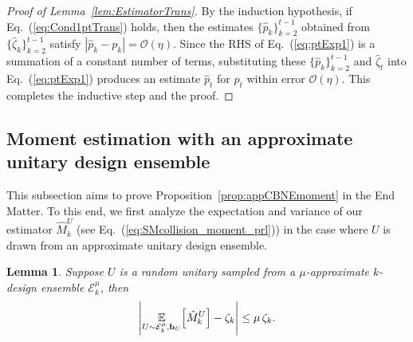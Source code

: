 \documentclass[aps,prl,twocolumn,nofootinbib,superscriptaddress,10pt]{revtex4-2}
\let\originalleft\left
\let\originalright\right
\renewcommand{\left}{\mathopen{}\mathclose\bgroup\originalleft}
\renewcommand{\right}{\aftergroup\egroup\originalright}
\def\E{ {\mathbb E} } %
\theoremstyle{plain}
\newtheorem{lemma}{Lemma}
\theoremstyle{definition}
\newcommand{\eref}[1]{Eq.~\textup{(\ref{#1})}}
\newcommand{\lref}[1]{Lemma~\ref{#1}}
\newcommand{\pref}[1]{Proposition~\ref{#1}}
\begin{document}
\begin{proof}[Proof of \lref{lem:EstimatorTrans}]
By the induction hypothesis, if \eref{eq:Cond1ptTrans} holds, then the estimates $\{\hat{p}_k\}_{k=2}^{t-1}$ obtained from $\{\hat{\zeta}_k\}_{k=2}^{t-1}$ satisfy $|\hat{p}_k - p_k| = \mathcal{O}(\eta)$. %
Since the RHS of \eref{eq:ptExp1} is a summation of a constant number of terms, 
substituting these $\{\hat{p}_k\}_{k=2}^{t-1}$ and $\hat{\zeta}_t$ into \eref{eq:ptExp1} produces an estimate $\hat{p}_t$ for $p_t$ within error $\mathcal{O}(\eta)$. This completes the inductive step and the proof.
\end{proof}


\subsection{Moment estimation with an approximate unitary design ensemble}\label{sec:appdesignCBNEmoment}

This subsection aims to prove \pref{prop:appCBNEmoment} in the End Matter.  %
To this end, we first analyze the expectation and variance of our estimator $\hat{M}_k^{U}$ (see \eref{eq:SMcollision_moment_prl}) in the case where $U$ is drawn from an approximate unitary design ensemble.


\begin{lemma}\label{lam:biasMkUapp}
Suppose $U$ is a random unitary sampled from a $\mu$-approximate $k$-design ensemble $\mathcal E_{k}^\mu$, then 
\begin{align}
 \left| \underset{U\sim \mathcal E_{k}^\mu,  \mathbf{b}_{U}}{\E} \left[ \hat{M}_k^{U}\right] -\zeta_k \right|  \leq \mu\, \zeta_k. 
\end{align}
\end{lemma}
\end{document}
